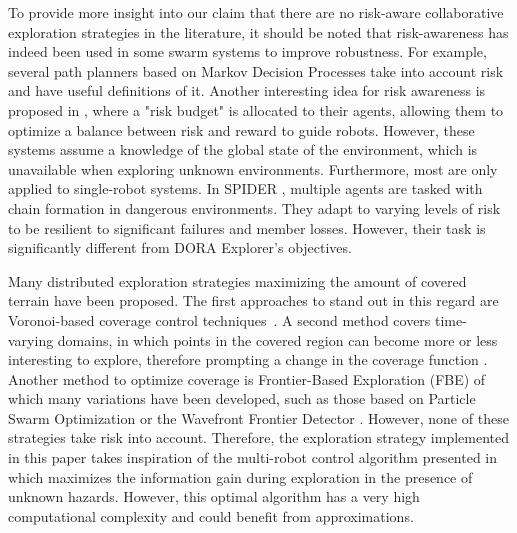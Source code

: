 To provide more insight into our claim that there are no risk-aware collaborative exploration strategies in  the literature, it should be noted that risk-awareness has indeed been used in some swarm systems to improve robustness. For example, several path planners based on Markov Decision Processes \cite{undurti2010online,thiebaux2016rao,xiao2020robot} take into account risk and have useful definitions of it. Another interesting idea for risk awareness is proposed in \cite{ono2008efficient,vitus2011feedback}, where a "risk budget" is allocated to their agents, allowing them to optimize a balance between risk and reward to guide robots. However, these systems assume a knowledge of the global state of the environment, which is unavailable when exploring unknown environments. Furthermore, most are only applied to single-robot systems. In SPIDER \cite{hunt2020spider}, multiple agents are tasked with chain formation in dangerous environments. They adapt to varying levels of risk to be resilient to significant failures and member losses. However, their task is significantly different from DORA Explorer's objectives.

Many distributed exploration strategies maximizing the amount of
covered terrain have been proposed. The first approaches to stand out
in this regard are Voronoi-based coverage control
techniques~\cite{luo2019voronoi,santos2019decentralized}. A second
method covers time-varying domains, in which points in the
covered region can become more or less interesting to explore,
therefore prompting a change in the coverage function
\cite{santos2019decentralized,xu2019multi}. Another method to optimize
coverage is Frontier-Based Exploration (FBE)
\cite{yamauchi1998frontier} of which many variations have been
developed, such as those based on Particle Swarm Optimization
\cite{wang2011frontier} or the Wavefront Frontier Detector
\cite{topiwala2018frontier}. However, none of these strategies take
risk into account. Therefore, the
exploration strategy implemented in this paper takes inspiration of
the multi-robot control algorithm presented in
\cite{dames2012decentralized,schwagerMultirobotControlPolicy2017}
which maximizes the information gain during exploration in the
presence of unknown hazards. However, this optimal algorithm has a
very high computational complexity and could benefit from approximations.



